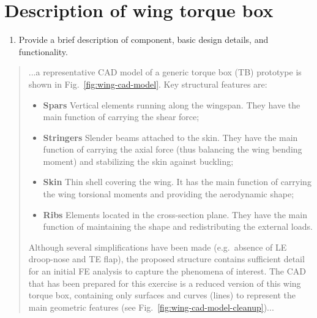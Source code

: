 \documentclass[11pt,a4paper,oneside]{memoir}
\begin{document}
\section{Description of wing torque box}

\begin{enumerate}
	\item Provide a brief description of component, basic design details, and functionality.
\end{enumerate}
%
\begin{quote} ...a representative CAD model of a generic torque box (TB) prototype is shown in Fig.~\ref{fig:wing-cad-model}. Key structural features are: 

\begin{itemize}
\item \textbf{Spars} Vertical elements running along the wingspan. They have the main function of carrying the shear force; 
\item \textbf{Stringers} Slender beams attached to the skin. They have the main function of carrying the axial force (thus balancing the wing bending moment) and stabilizing the skin against buckling; 
\item \textbf{Skin} Thin shell covering the wing. It has the main function of carrying the wing torsional moments and providing the aerodynamic shape; 
\item \textbf{Ribs} Elements located in the cross-section plane. They have the main function of maintaining the shape and redistributing the external loads.
\end{itemize}
%
Although several simplifications have been made (e.g.~absence of LE droop-nose and TE flap), the proposed structure contains sufficient detail for an initial FE analysis to capture the phenomena of interest. The CAD that has been prepared for this exercise is a reduced version of this wing torque box, containing only surfaces and curves (lines) to represent the main geometric features (see Fig.~\ref{fig:wing-cad-model-cleanup})...\end{quote}
%
\end{document}

